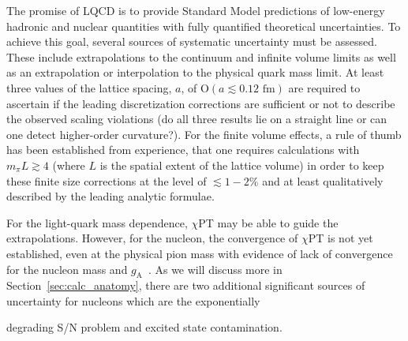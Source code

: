 \documentclass{ar-1col}
\begin{document}
The promise of LQCD is to provide Standard Model predictions of low-energy hadronic and nuclear quantities with fully quantified theoretical uncertainties.
To achieve this goal, several sources of systematic uncertainty must be assessed.
These include extrapolations to the continuum and infinite volume limits as well as an extrapolation or interpolation to the physical quark mass limit.
At least three values of the lattice spacing, $a$, of $\mathrm{O}(a\lesssim0.12\textrm{ fm})$ are required to ascertain if the leading discretization corrections are sufficient or not to describe the observed scaling violations (do all three results lie on a straight line or can one detect higher-order curvature?).
For the finite volume effects, a rule of thumb has been established from experience, that one requires calculations with $m_\pi L \gtrsim4$ (where $L$ is the spatial extent of the lattice volume) in order to keep these finite size corrections at the level of $\lesssim1-2\%$ and at least qualitatively described by the leading analytic formulae.%
\begin{marginnote}
\end{marginnote}%
For the light-quark mass dependence, $\chi$PT may be able to guide the extrapolations.
However, for the nucleon, the convergence of $\chi$PT is not yet established, even at the physical pion mass with evidence of lack of convergence for the nucleon mass and $g_{\mathrm{A}}$~\cite{Chang:2018uxx,Walker-Loud:2019cif}.
As we will discuss more in Section~\ref{sec:calc_anatomy}, there are two additional significant sources of uncertainty for nucleons which are the exponentially%
\begin{marginnote}
\end{marginnote}%
degrading S/N problem and excited state contamination.



\end{document}
